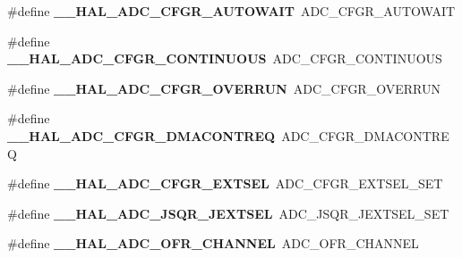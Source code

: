 \begin{DoxyCompactItemize}
\item 
\#define {\bfseries \+\_\+\+\_\+\+H\+A\+L\+\_\+\+A\+D\+C\+\_\+\+C\+F\+G\+R\+\_\+\+A\+U\+T\+O\+W\+A\+IT}~A\+D\+C\+\_\+\+C\+F\+G\+R\+\_\+\+A\+U\+T\+O\+W\+A\+IT\hypertarget{group___h_a_l___a_d_c___aliased___macros_ga2b6be3d51e5b71511f3db77d6781fc85}{}\label{group___h_a_l___a_d_c___aliased___macros_ga2b6be3d51e5b71511f3db77d6781fc85}

\item 
\#define {\bfseries \+\_\+\+\_\+\+H\+A\+L\+\_\+\+A\+D\+C\+\_\+\+C\+F\+G\+R\+\_\+\+C\+O\+N\+T\+I\+N\+U\+O\+US}~A\+D\+C\+\_\+\+C\+F\+G\+R\+\_\+\+C\+O\+N\+T\+I\+N\+U\+O\+US\hypertarget{group___h_a_l___a_d_c___aliased___macros_gab45f96be007a67f1251d47410b5c9618}{}\label{group___h_a_l___a_d_c___aliased___macros_gab45f96be007a67f1251d47410b5c9618}

\item 
\#define {\bfseries \+\_\+\+\_\+\+H\+A\+L\+\_\+\+A\+D\+C\+\_\+\+C\+F\+G\+R\+\_\+\+O\+V\+E\+R\+R\+UN}~A\+D\+C\+\_\+\+C\+F\+G\+R\+\_\+\+O\+V\+E\+R\+R\+UN\hypertarget{group___h_a_l___a_d_c___aliased___macros_ga4312a4ed4373cdd0302434574aa0c8c9}{}\label{group___h_a_l___a_d_c___aliased___macros_ga4312a4ed4373cdd0302434574aa0c8c9}

\item 
\#define {\bfseries \+\_\+\+\_\+\+H\+A\+L\+\_\+\+A\+D\+C\+\_\+\+C\+F\+G\+R\+\_\+\+D\+M\+A\+C\+O\+N\+T\+R\+EQ}~A\+D\+C\+\_\+\+C\+F\+G\+R\+\_\+\+D\+M\+A\+C\+O\+N\+T\+R\+EQ\hypertarget{group___h_a_l___a_d_c___aliased___macros_gaa80ebf8b334aa3e040d153ec06c880e2}{}\label{group___h_a_l___a_d_c___aliased___macros_gaa80ebf8b334aa3e040d153ec06c880e2}

\item 
\#define {\bfseries \+\_\+\+\_\+\+H\+A\+L\+\_\+\+A\+D\+C\+\_\+\+C\+F\+G\+R\+\_\+\+E\+X\+T\+S\+EL}~A\+D\+C\+\_\+\+C\+F\+G\+R\+\_\+\+E\+X\+T\+S\+E\+L\+\_\+\+S\+ET\hypertarget{group___h_a_l___a_d_c___aliased___macros_gacc58e207b5fcc238afb480a00997d167}{}\label{group___h_a_l___a_d_c___aliased___macros_gacc58e207b5fcc238afb480a00997d167}

\item 
\#define {\bfseries \+\_\+\+\_\+\+H\+A\+L\+\_\+\+A\+D\+C\+\_\+\+J\+S\+Q\+R\+\_\+\+J\+E\+X\+T\+S\+EL}~A\+D\+C\+\_\+\+J\+S\+Q\+R\+\_\+\+J\+E\+X\+T\+S\+E\+L\+\_\+\+S\+ET\hypertarget{group___h_a_l___a_d_c___aliased___macros_ga362667abab4da4e626e45c9aef345d85}{}\label{group___h_a_l___a_d_c___aliased___macros_ga362667abab4da4e626e45c9aef345d85}

\item 
\#define {\bfseries \+\_\+\+\_\+\+H\+A\+L\+\_\+\+A\+D\+C\+\_\+\+O\+F\+R\+\_\+\+C\+H\+A\+N\+N\+EL}~A\+D\+C\+\_\+\+O\+F\+R\+\_\+\+C\+H\+A\+N\+N\+EL\hypertarget{group___h_a_l___a_d_c___aliased___macros_gad3ba77f5090921040fa9a63ff8d31241}{}\label{group___h_a_l___a_d_c___aliased___macros_gad3ba77f5090921040fa9a63ff8d31241}


\end{DoxyCompactItemize}
